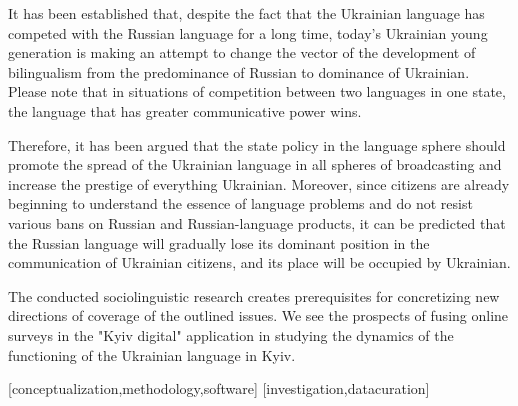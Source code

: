\documentclass[english]{textolivre}
\begin{document}
It has been established that, despite the fact that the Ukrainian language has competed with the Russian language for a long time, today's Ukrainian young generation is making an attempt to change the vector of the development of bilingualism from the predominance of Russian to dominance of Ukrainian. Please note that in situations of competition between two languages in one state, the language that has greater communicative power wins.

Therefore, it has been argued that the state policy in the language sphere should promote the spread of the Ukrainian language in all spheres of broadcasting and increase the prestige of everything Ukrainian. Moreover, since citizens are already beginning to understand the essence of language problems and do not resist various bans on Russian and Russian-language products, it can be predicted that the Russian language will gradually lose its dominant position in the communication of Ukrainian citizens, and its place will be occupied by Ukrainian.

The conducted sociolinguistic research creates prerequisites for concretizing new directions of coverage of the outlined issues. We see the prospects of fusing online surveys in the "Kyiv digital" application in studying the dynamics of the functioning of the Ukrainian language in Kyiv.



\printbibliography\label{sec-bib}


\begin{contributors}
[conceptualization,methodology,software]
[investigation,datacuration]
\end{contributors}
\end{document}
